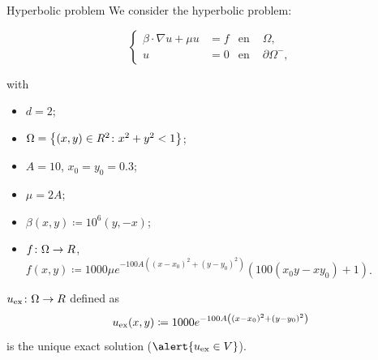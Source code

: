 		\begin{frame}{Hyperbolic problem}
			\scriptsize
			We consider the hyperbolic problem:
			\begin{block}{}
			\begin{equation*}
			\left\{
			\begin{aligned}
			\beta\cdot\nabla u+\mu u&=f & \text{en } &\Omega, \\
			u&=0 & \text{en } &\partial\Omega^-,
			\end{aligned}
			\right.
			\end{equation*}
			\end{block}
			with
			\begin{itemize}
				\item $d=2$;
				\item $\Omega=\left\{(x,y)\in\relax R^2\colon x^2+y^2<1 \right\}$;
				\item $A=10$, $x_0=y_0=0.3$;
				\item $\mu=2A$;
				\item $\beta(x,y)\coloneqq10^6(y,-x)$;
				\item $f\colon\Omega\to\relax R$, $f(x,y)\coloneqq 1000\mu e^{-100A\left((x-x_0)^2+(y-y_0)^2\right)}(100(x_0 y -x y_0) + 1)$.
			\end{itemize}
			
			\vspace*{0.3cm}
			$u_{\text{ex}}\colon\Omega\to\relax R$ defined as
			\begin{equation*}
			u_{\text{ex}} (x,y)\coloneqq 1000e^{-100A\left((x-x_0)^2+(y-y_0)^2\right)}
			\end{equation*}
			is the \alert{unique exact solution} ($\alert{u_\text{ex}\in V}$).
			
			\end{frame}


